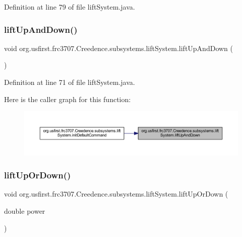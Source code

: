 Definition at line 79 of file lift\+System.\+java.

\mbox{\label{classorg_1_1usfirst_1_1frc3707_1_1_creedence_1_1subsystems_1_1lift_system_a2d90a37ee48a025f8df67abb1e175ba6}} 
\subsubsection{\texorpdfstring{liftUpAndDown()}{liftUpAndDown()}}
{\footnotesize\ttfamily void org.\+usfirst.\+frc3707.\+Creedence.\+subsystems.\+lift\+System.\+lift\+Up\+And\+Down (\begin{DoxyParamCaption}{ }\end{DoxyParamCaption})}



Definition at line 71 of file lift\+System.\+java.

Here is the caller graph for this function\+:
\nopagebreak
\begin{figure}[H]
\begin{center}
\leavevmode
\includegraphics[width=350pt]{classorg_1_1usfirst_1_1frc3707_1_1_creedence_1_1subsystems_1_1lift_system_a2d90a37ee48a025f8df67abb1e175ba6_icgraph}
\end{center}
\end{figure}
\mbox{\label{classorg_1_1usfirst_1_1frc3707_1_1_creedence_1_1subsystems_1_1lift_system_a3280fa8a5a5df9f5f9f892a754e5bece}} 
\subsubsection{\texorpdfstring{liftUpOrDown()}{liftUpOrDown()}}
{\footnotesize\ttfamily void org.\+usfirst.\+frc3707.\+Creedence.\+subsystems.\+lift\+System.\+lift\+Up\+Or\+Down (\begin{DoxyParamCaption}\item[{double}]{power }\end{DoxyParamCaption})}



